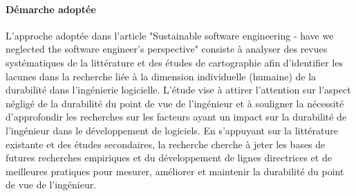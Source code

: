 \paragraph{Démarche adoptée}
L'approche adoptée dans l'article "Sustainable software engineering - have we neglected the software engineer's perspective" consiste à analyser des revues systématiques de la littérature et des études de cartographie afin d'identifier les lacunes dans la recherche liée à la dimension individuelle (humaine) de la durabilité dans l'ingénierie logicielle. L'étude vise à attirer l'attention sur l'aspect négligé de la durabilité du point de vue de l'ingénieur et à souligner la nécessité d'approfondir les recherches sur les facteurs ayant un impact sur la durabilité de l'ingénieur dans le développement de logiciels. En s'appuyant sur la littérature existante et des études secondaires, la recherche cherche à jeter les bases de futures recherches empiriques et du développement de lignes directrices et de meilleures pratiques pour mesurer, améliorer et maintenir la durabilité du point de vue de l'ingénieur.

